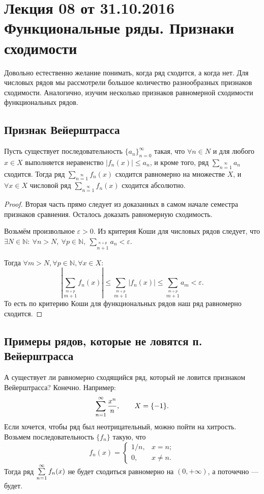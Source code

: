 \documentclass[a4paper, 12pt]{article}
\begin{document}
\pagestyle{fancy}
\section{Лекция 08 от 31.10.2016 \\ Функциональные ряды. Признаки сходимости}
	
	Довольно естественно желание понимать, когда ряд сходится, а когда нет. Для числовых рядов мы рассмотрели большое количество разнообразных признаков сходимости. Аналогично, изучим несколько признаков равномерной сходимости функциональных рядов.
	
	\subsection{Признак Вейерштрасса}
	
	\begin{Test}
		
		Пусть существует последовательность $\{a_n\}_{n=0}^\infty$ такая, что $\forall n \in N$ и для любого $x\in X$ выполняется неравенство $|f_n(x)|\leq a_n$, и кроме того, ряд $\sum_{n=1}\limits^{\infty}a_n$ сходится. Тогда ряд $\sum_{n=1}\limits^{\infty}f_n(x)$ сходится равномерно на множестве $X$, и $\forall x \in X$ числовой ряд $\sum_{n=1}\limits^{\infty}f_n(x)$ сходится абсолютно.
	\end{Test}
	
	\begin{proof}
		Вторая часть прямо следует из доказанных в самом начале семестра признаков сравнения. Осталось доказать равномерную сходимость.
		
		Возьмём произвольное $\varepsilon>0$. Из критерия Коши для числовых рядов следует, что $\exists N\in \mathbb{N}: \ \forall n>N, \ \forall p\in \mathbb{N}, \ \sum_{n+1}\limits^{n+p}a_n < \varepsilon$.
		
		Тогда $\forall m>N, \forall p\in \mathbb{N}, \forall x \in X:$
		\[
		\left| \sum_{m+1}\limits^{m+p}f_n(x)\right|  \leq \sum_{m+1}\limits^{m+p} |f_n(x)| \leq  \sum_{m+1}\limits^{m+p}a_m < \varepsilon.
		\]
		То есть по критерию Коши для функциональных рядов наш ряд равномерно сходится.
	\end{proof}
	
	\subsection{Примеры рядов, которые не ловятся п. Вейерштрасса}
	
	А существует ли равномерно сходящийся ряд, который не ловится признаком Вейерштрасса? Конечно. Например:
	$$
	\sum\limits_{n=1}^{\infty} \frac{x^n}{n}, \qquad X = \{-1\}.
	$$
	Если хочется, чтобы ряд был неотрицательный, можно пойти на хитрость. Возьмем последовательность $\{f_n\}$ такую, что
	$$
	f_n(x) = \begin{cases}
	1/n, & x = n; \\
	0, & x \neq n.
	\end{cases}
	$$
	Тогда ряд $\sum\limits_{n=1}^{\infty} f_n(x)$ не будет сходиться равномерно на $(0, +\infty)$, а поточечно --- будет.
	
\end{document}
